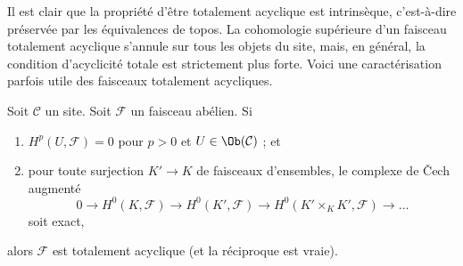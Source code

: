 \noindent
Il est clair que la propriété d'être totalement acyclique est intrinsèque,
c'est-à-dire préservée par les équivalences de topos.
La cohomologie supérieure d'un faisceau totalement acyclique s'annule sur tous
les objets du site, mais, en général, la condition d'acyclicité totale est
strictement plus forte. Voici une caractérisation parfois utile des faisceaux
totalement acycliques.

\begin{lemma}
\label{lemma-characterize-limp}
Soit $\mathcal{C}$ un site. Soit $\mathcal{F}$ un faisceau abélien. Si
\begin{enumerate}
\item $H^p(U, \mathcal{F}) = 0$ pour $p > 0$ et
$U \in \Ob(\mathcal{C})$ ; et
\item pour toute surjection $K' \to K$ de faisceaux d'ensembles, le complexe
de {\v C}ech augmenté
$$
0 \to H^0(K, \mathcal{F}) \to H^0(K', \mathcal{F}) \to
H^0(K' \times_K K', \mathcal{F}) \to \ldots
$$
soit exact,
\end{enumerate}
alors $\mathcal{F}$ est totalement acyclique (et la réciproque est vraie).
\end{lemma}

